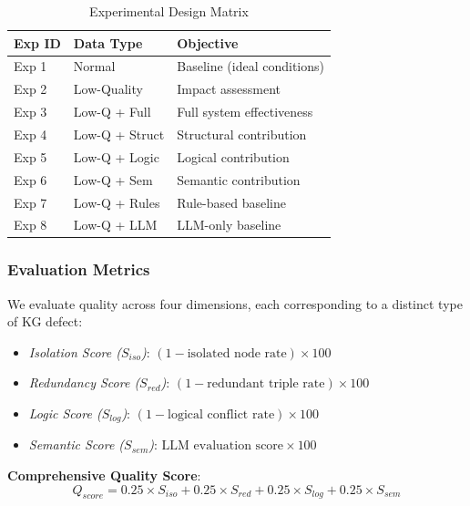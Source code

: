 \documentclass[runningheads]{llncs}
\begin{document}
\begin{table}[H]
    \centering
    \caption{Experimental Design Matrix}
    \label{tab:exp_design}
    \small
    \begin{tabular}{l l p{6cm}}
    \toprule
    \textbf{Exp ID} & \textbf{Data Type} & \textbf{Objective} \\
    \midrule
    Exp 1 & Normal & Baseline (ideal conditions) \\
    Exp 2 & Low-Quality & Impact assessment \\
    Exp 3 & Low-Q + Full & Full system effectiveness \\
    Exp 4 & Low-Q + Struct & Structural contribution \\
    Exp 5 & Low-Q + Logic & Logical contribution \\
    Exp 6 & Low-Q + Sem & Semantic contribution \\
    Exp 7 & Low-Q + Rules & Rule-based baseline \\
    Exp 8 & Low-Q + LLM & LLM-only baseline \\
    \bottomrule
    \end{tabular}
\end{table}

\subsubsection{Evaluation Metrics}
We evaluate quality across four dimensions, each corresponding to a distinct type of KG defect:
\begin{itemize}
    \item \textit{Isolation Score ($S_{iso}$)}: $(1 - \text{isolated node rate}) \times 100$
    \item \textit{Redundancy Score ($S_{red}$)}: $(1 - \text{redundant triple rate}) \times 100$
    \item \textit{Logic Score ($S_{log}$)}: $(1 - \text{logical conflict rate}) \times 100$
    \item \textit{Semantic Score ($S_{sem}$)}: $\text{LLM evaluation score} \times 100$
\end{itemize}

\noindent \textbf{Comprehensive Quality Score}:
$$Q_{score} = 0.25 \times S_{iso} + 0.25 \times S_{red} + 0.25 \times S_{log} + 0.25 \times S_{sem}$$
\end{document}
